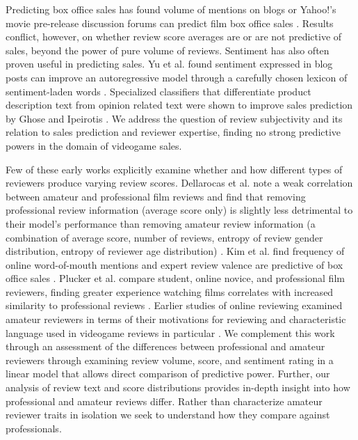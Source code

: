 \documentclass[letterpaper]{article}
\begin{document}
Predicting box office sales has found volume of mentions on blogs or Yahoo!'s movie pre-release discussion forums can predict film box office sales \cite{liu2001word,duan2008online}. Results conflict, however, on whether review score averages are \cite{dellarocas2007exploring,hennig-thurau2012movie-reanalysis} or are not \cite{liu2001word,duan2008online} predictive of sales, beyond the power of pure volume of reviews.
Sentiment has also often proven useful in predicting sales. Yu et al. found sentiment expressed in blog posts can improve an autoregressive model through a carefully chosen lexicon of sentiment-laden words \cite{yu2012mining}. Specialized classifiers that differentiate product description text from opinion related text were shown to improve sales prediction by Ghose and Ipeirotis \cite{ghose2007designing}. 
We address the question of review subjectivity and its relation to sales prediction and reviewer expertise, finding no strong predictive powers in the domain of videogame sales.

Few of these early works explicitly examine whether and how different types of reviewers produce varying review scores. 
Dellarocas et al. note a weak correlation between amateur and professional film reviews and find that removing professional review information (average score only) is slightly less detrimental to their model's performance than removing amateur review information (a combination of average score, number of reviews, entropy of review gender distribution, entropy of reviewer age distribution) \cite{dellarocas2007exploring}. 
Kim et al. find frequency of online word-of-mouth mentions and expert review valence are predictive of box office sales \cite{kim2013moviewom}.
Plucker et al. compare student, online novice, and professional film reviewers, finding greater experience watching films correlates with increased similarity to professional reviews \cite{plucker2009pro-novice-eval}. 
Earlier studies of online reviewing examined amateur reviewers in terms of their motivations for reviewing \cite{gilbert2010deja} and characteristic language used in videogame reviews in particular \cite{zagal2011natural}. We complement this work through an assessment of the differences between professional and amateur reviewers through examining review volume, score, and sentiment rating in a linear model that allows direct comparison of predictive power. Further, our analysis of review text and score distributions provides in-depth insight into how professional and amateur reviews differ. Rather than characterize amateur reviewer traits in isolation we seek to understand how they compare against professionals.
\end{document}
